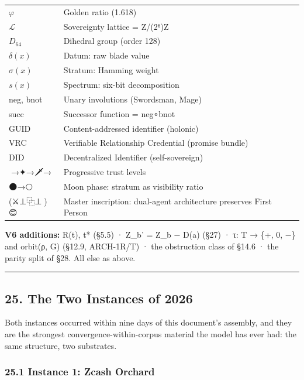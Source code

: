 \documentclass[
]{article}
\begin{document}
{\begin{longtable}[]{@{}
  >{\raggedright\arraybackslash}p{}
  >{\raggedright\arraybackslash}p{}@{}}
\(\varphi\) & Golden ratio (1.618) \\
\(\mathcal{L}\) & Sovereignty lattice = Z/(2⁶)Z \\
\(D_{64}\) & Dihedral group (order 128) \\
\(\delta(x)\) & Datum: raw blade value \\
\(\sigma(x)\) & Stratum: Hamming weight \\
\(s(x)\) & Spectrum: six-bit decomposition \\
neg, bnot & Unary involutions (Swordsman, Mage) \\
succ & Successor function = neg∘bnot \\
GUID & Content-addressed identifier (holonic) \\
VRC & Verifiable Relationship Credential (promise bundle) \\
DID & Decentralized Identifier (self-sovereign) \\
🔑→✦→🗡️→🔮 & Progressive trust levels \\
🌑→🌕 & Moon phase: stratum as visibility ratio \\
(⚔️⊥⿻⊥🧙)😊 & Master inscription: dual-agent architecture preserves
First Person \\
\end{longtable}
}

\textbf{V6 additions:} R(t), t* (§5.5) · Z\_b' = Z\_b − D(a) (§27) · τ:
T → \{+, 0, −\} and orbit(ρ, G) (§12.9, ARCH-1R/T) · the obstruction
class of §14.6 · the parity split of §28. All else as above.

\begin{center}\rule{0.5\linewidth}{0.5pt}\end{center}

\subsection{25. The Two Instances of
2026}\label{the-two-instances-of-2026}

Both instances occurred within nine days of this document's assembly,
and they are the strongest convergence-within-corpus material the model
has ever had: the same structure, two substrates.

\subsubsection{25.1 Instance 1: Zcash
Orchard}\label{instance-1-zcash-orchard}
\end{document}
